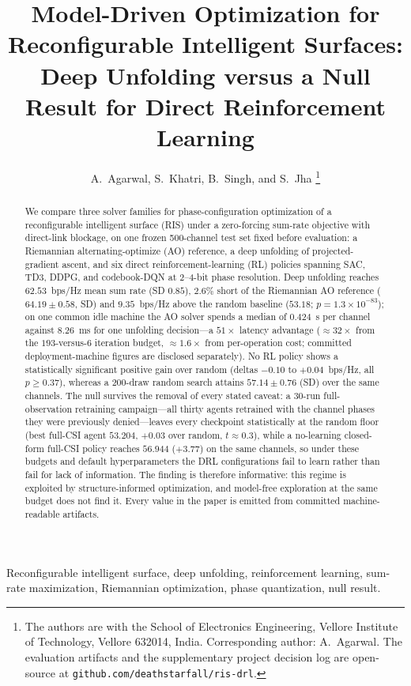 \documentclass[journal]{IEEEtran}
\begin{document}
\title{Model-Driven Optimization for Reconfigurable Intelligent
Surfaces: Deep Unfolding versus a Null Result for Direct
Reinforcement Learning}
\author{A.~Agarwal, S.~Khatri, B.~Singh, and S.~Jha%
\thanks{The authors are with the School of Electronics Engineering,
Vellore Institute of Technology, Vellore 632014, India.
Corresponding author: A.~Agarwal. The evaluation artifacts and the
supplementary project decision log are open-source at
\texttt{github.com/deathstarfall/ris-drl}.}}
\maketitle

\begin{IEEEkeywords}
Reconfigurable intelligent surface, deep unfolding, reinforcement
learning, sum-rate maximization, Riemannian optimization, phase
quantization, null result.
\end{IEEEkeywords}

\begin{abstract}
We compare three solver families for phase-configuration
optimization of a reconfigurable intelligent surface (RIS) under a
zero-forcing sum-rate objective with direct-link blockage, on one
frozen 500-channel test set fixed before evaluation: a Riemannian
alternating-optimize (AO) reference, a deep unfolding of
projected-gradient ascent, and six direct reinforcement-learning (RL)
policies spanning SAC, TD3, DDPG, and codebook-DQN at 2--4-bit phase
resolution. Deep unfolding reaches $62.53$~bps/Hz mean sum rate
(SD $0.85$), $2.6\%$ short of the Riemannian AO reference
($64.19\pm0.58$, SD) and $9.35$~bps/Hz above the random baseline
($53.18$; $p=1.3\times10^{-83}$); on one common idle machine the AO
solver spends a median of $0.424$~s per channel against $8.26$~ms for
one unfolding decision---a $51\times$ latency advantage ($\approx
32\times$ from the $193$-versus-$6$ iteration budget, $\approx 1.6\times$
from per-operation cost; committed deployment-machine figures are
disclosed separately). No RL policy shows a
statistically significant positive gain over random
(deltas $-0.10$ to $+0.04$~bps/Hz, all $p \geq 0.37$), whereas a
200-draw random search attains $57.14\pm0.76$ (SD) over the same
channels. The null survives the removal of every stated caveat: a
30-run full-observation retraining campaign---all thirty agents
retrained with the channel phases they were previously denied---leaves
every checkpoint statistically at the random floor (best full-CSI
agent $53.204$, $+0.03$ over random, $t \approx 0.3$), while a
no-learning closed-form full-CSI policy reaches $56.944$ ($+3.77$) on
the same channels, so under these budgets and default hyperparameters the
DRL configurations fail to learn rather than fail for lack of
information.
The finding is therefore informative: this regime is exploited
by structure-informed optimization, and model-free exploration at the
same budget does not find it. Every value in the paper is emitted from
committed machine-readable artifacts.
\end{abstract}
\end{document}
